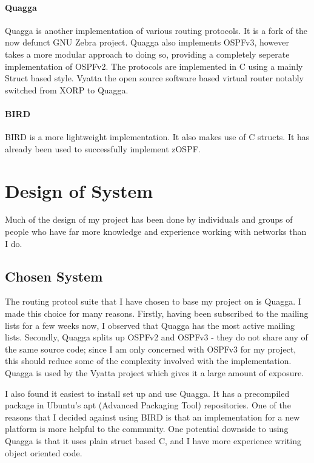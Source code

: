 \documentclass[12pt]{report}
\begin{document}
\subsubsection{Quagga}


Quagga is another implementation of various routing protocols.  It is a
fork of the now defunct GNU Zebra project.  Quagga also implements
OSPFv3, however takes a more modular approach to doing so, providing a
completely seperate implementation of OSPFv2. The protocols are
implemented in C using a mainly Struct based style.  Vyatta the open
source software based virtual router notably switched from XORP to
Quagga. 

\subsubsection{BIRD}
BIRD is a more lightweight implementation. It also makes use of C
structs. It has already been used to successfully implement zOSPF.

\chapter{Design of System}
Much of the design of my project has been done by individuals and groups of
people who have far more knowledge and experience working with networks than I
do. 

\section{Chosen System}
The routing protcol suite that I have chosen to base my project on is Quagga. I
made this choice for many reasons. Firstly, having been subscribed to the
mailing lists for a few weeks now, I observed that Quagga has the most active
mailing lists. Secondly, Quagga splits up OSPFv2 and OSPFv3 - they do not share
any of the same source code; since I am only concerned with OSPFv3 for my
project, this should reduce some of the complexity involved with the
implementation. Quagga is used by the Vyatta project which gives it a large
amount of exposure. 

I also found it easiest to install set up and use Quagga. It has a precompiled
package in Ubuntu's apt (Advanced Packaging Tool) repositories. One of the
reasons that I decided against using BIRD is that an implementation for a new
platform is more helpful to the community. One potential downside to using
Quagga is that it uses plain struct based C, and I have more experience writing
object oriented code. 
\end{document}
